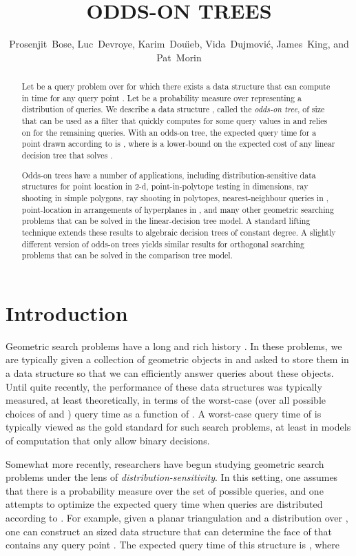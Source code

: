 \documentclass{patmorin}
\title{\MakeUppercase{Odds-On Trees}}
\author{Prosenjit~Bose, 
        Luc~Devroye,
	Karim~Dou\"{\i}eb, 
	Vida~Dujmovi\'c, 
	James~King, and 
	Pat~Morin}
\begin{document}
\maketitle

\begin{abstract}
  Let  be a query problem over 
  for which there exists a data structure  that can compute
   in  time for any query point .
  Let  be a probability measure over  representing a distribution
  of queries.  We describe a data structure , called
  the \emph{odds-on tree}, of size  that can be used as a
  filter that quickly computes  for some query values in
   and relies on  for the remaining queries.  With an
  odds-on tree, the expected query time for a point drawn according to
   is , where  is a lower-bound on the expected cost
  of any linear decision tree that solves .

  Odds-on trees have a number of applications, including
  distribution-sensitive data structures for point location in 2-d,
  point-in-polytope testing in  dimensions, ray shooting in simple
  polygons, ray shooting in polytopes, nearest-neighbour queries in
  , point-location in arrangements of hyperplanes in ,
  and many other geometric searching problems that can be solved in the
  linear-decision tree model.  A standard lifting technique extends these
  results to algebraic decision trees of constant degree.  A slightly
  different version of odds-on trees yields similar results for orthogonal
  searching problems that can be solved in the comparison tree model.
\end{abstract}

\section{Introduction}

Geometric search problems have a long and rich history
\cite{ae99,g00chapter,ms05}. In these problems, we are typically
given a collection  of  geometric objects in  and asked
to store them in a data structure so that we can efficiently answer
queries about these objects. Until quite recently, the performance of
these data structures was typically measured, at least theoretically,
in terms of the worst-case (over all possible choices of  and )
query time as a function of .  A worst-case query time of  is typically viewed as the gold standard for such search problems,
at least in models of computation that only allow binary decisions.

Somewhat more recently, researchers have begun studying geometric
search problems under the lens of \emph{distribution-sensitivity}. In
this setting, one assumes that there is a probability measure  over
the set of possible queries, and one attempts to optimize the expected
query time when queries are distributed according to .  For example,
given a planar triangulation  and a distribution  over ,
one can construct an  sized data structure that can determine
the face of  that contains any query point .  The expected
query time of this structure is , where
\end{document}
